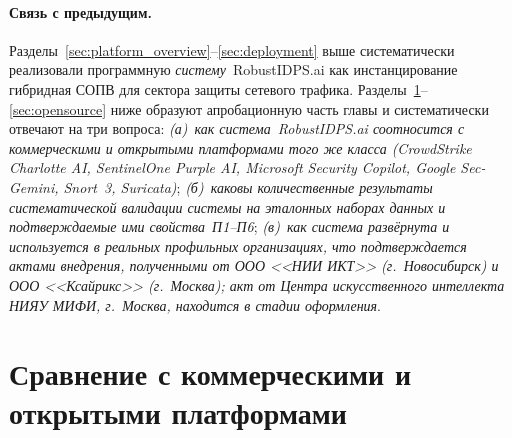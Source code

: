 \paragraph{Связь с предыдущим.}
Разделы~\ref{sec:platform_overview}--\ref{sec:deployment} выше
систематически реализовали программную \emph{систему}~\textsf{RobustIDPS.ai}
как инстанцирование гибридная СОПВ для сектора защиты сетевого
трафика. Разделы~\ref{sec:platform_comparison}--\ref{sec:opensource}
ниже образуют апробационную часть главы и систематически отвечают
на три вопроса: \emph{(а)~как система~\textsf{RobustIDPS.ai}
соотносится с коммерческими и открытыми платформами того же
класса (CrowdStrike Charlotte AI, SentinelOne Purple AI,
Microsoft Security Copilot, Google Sec-Gemini, Snort~3, Suricata)};
\emph{(б)~каковы количественные результаты систематической
валидации системы на эталонных наборах данных и подтверждаемые
ими свойства~П1--П6}; \emph{(в)~как система развёрнута и
используется в реальных профильных организациях, что подтверждается
актами внедрения, полученными от ООО <<НИИ ИКТ>> (г.~Новосибирск)
и ООО <<Ксайрикс>> (г.~Москва); акт от Центра искусственного
интеллекта НИЯУ МИФИ, г.~Москва, находится в стадии оформления}.

\section{Сравнение с коммерческими и открытыми платформами}
\label{sec:platform_comparison}


